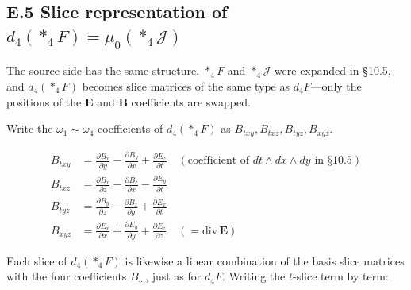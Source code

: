 \hypertarget{e.5-slice-representation-of-d_4ast_4f-mu_0ast_4mathcalj}{%
\subsection{\texorpdfstring{E.5 Slice representation of
\(d_4(\ast_4F) = \mu_0(\ast_4\mathcal{J})\)}{E.5 Slice representation of d\_4(\textbackslash ast\_4F) = \textbackslash mu\_0(\textbackslash ast\_4\textbackslash mathcal\{J\})}}\label{e.5-slice-representation-of-d_4ast_4f-mu_0ast_4mathcalj}}

The source side has the same structure. \(\ast_4F\) and
\(\ast_4\mathcal{J}\) were expanded in §10.5, and \(d_4(\ast_4F)\)
becomes slice matrices of the same type as \(d_4F\)---only the positions
of the \(\mathbf{E}\) and \(\mathbf{B}\) coefficients are swapped.

Write the \(\omega_1\sim\omega_4\) coefficients of \(d_4(\ast_4F)\) as
\(B_{txy}, B_{txz}, B_{tyz}, B_{xyz}\).

\[
\begin{aligned}
B_{txy} &= \frac{\partial B_x}{\partial y} - \frac{\partial B_y}{\partial x} + \frac{\partial E_z}{\partial t}
\quad (\text{coefficient of } dt\wedge dx\wedge dy \text{ in §10.5}) \\[6pt]
B_{txz} &= \frac{\partial B_x}{\partial z} - \frac{\partial B_z}{\partial x} - \frac{\partial E_y}{\partial t} \\[6pt]
B_{tyz} &= \frac{\partial B_y}{\partial z} - \frac{\partial B_z}{\partial y} + \frac{\partial E_x}{\partial t} \\[6pt]
B_{xyz} &= \frac{\partial E_x}{\partial x} + \frac{\partial E_y}{\partial y} + \frac{\partial E_z}{\partial z}
\quad (= \mathrm{div}\,\mathbf{E})
\end{aligned}
\]

Each slice of \(d_4(\ast_4F)\) is likewise a linear combination of the
basis slice matrices with the four coefficients \(B_{\cdots}\), just as
for \(d_4F\). Writing the \(t\)-slice term by term:

